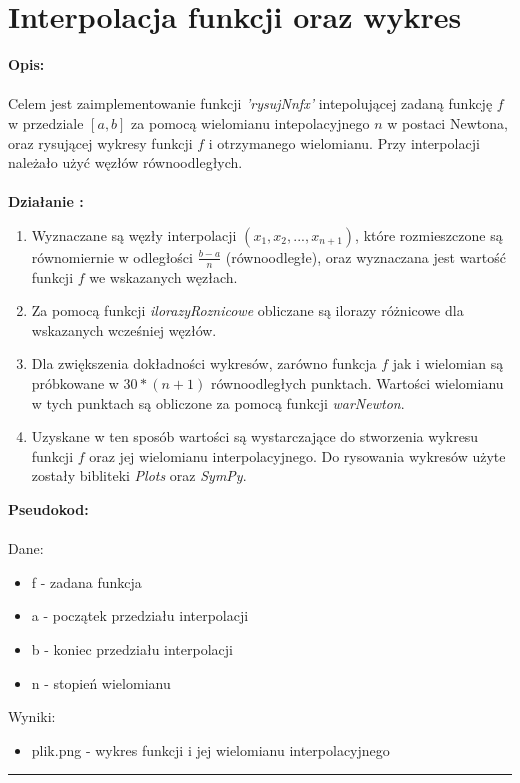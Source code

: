 \documentclass{article}
\begin{document}
\section*{Interpolacja funkcji oraz wykres}
\noindent \textbf{Opis: } \\\\
Celem jest zaimplementowanie funkcji \textit{'rysujNnfx'} intepolującej zadaną funkcję $f$ w przedziale $[a,b]$ za pomocą wielomianu intepolacyjnego $n$ w postaci Newtona, oraz rysującej wykresy funkcji $f$ i otrzymanego wielomianu. Przy interpolacji należało użyć węzłów równoodległych.\\\\
\noindent \textbf{Działanie : } 
\begin{enumerate}
	\item Wyznaczane są węzły interpolacji $(x_1,x_2,...,x_{n+1})$, które rozmieszczone są równomiernie w odległości $\frac{b-a}{n}$ (równoodległe), oraz wyznaczana jest wartość funkcji $f$ we wskazanych węzłach.
	\item Za pomocą funkcji \textit{ilorazyRoznicowe} obliczane są ilorazy różnicowe dla wskazanych wcześniej węzłów.
	\item Dla zwiększenia dokładności wykresów, zarówno funkcja $f$ jak i wielomian są próbkowane w $30*(n+1)$ równoodległych punktach. Wartości wielomianu w tych punktach są obliczone za pomocą funkcji \textit{warNewton}.
	\item Uzyskane w ten sposób wartości są wystarczające do stworzenia wykresu funkcji $f$ oraz jej wielomianu interpolacyjnego. Do rysowania wykresów użyte zostały bibliteki \textit{Plots} oraz \textit{SymPy}.
\end{enumerate}
\noindent \textbf{Pseudokod: } \\\\
Dane:
\begin{itemize}
	\item f - zadana funkcja
	\item a - początek przedziału interpolacji
	\item b - koniec przedziału interpolacji
	\item n - stopień wielomianu
\end{itemize}
Wyniki:
\begin{itemize}
	\item plik.png - wykres funkcji i jej wielomianu interpolacyjnego
\end{itemize}
\rule{\textwidth}{0.4pt}
\end{document}
